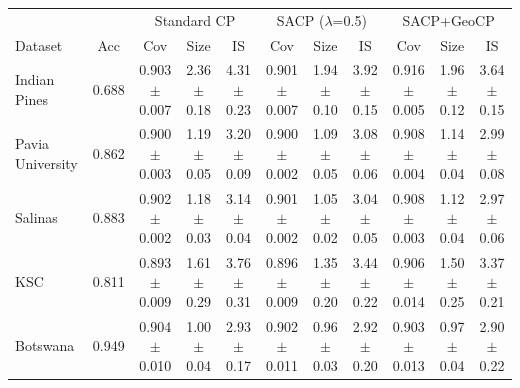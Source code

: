 \begin{tabular}{l|c|ccc|ccc|ccc}
\toprule
 & & \multicolumn{3}{c|}{Standard CP} & \multicolumn{3}{c|}{SACP ($\lambda$=0.5)} & \multicolumn{3}{c}{SACP+GeoCP} \\
Dataset & Acc & Cov & Size & IS & Cov & Size & IS & Cov & Size & IS \\
\midrule
Indian Pines & 0.688 & 0.903$\pm$0.007 & 2.36$\pm$0.18 & 4.31$\pm$0.23 & 0.901$\pm$0.007 & 1.94$\pm$0.10 & 3.92$\pm$0.15 & 0.916$\pm$0.005 & 1.96$\pm$0.12 & 3.64$\pm$0.15 \\
Pavia University & 0.862 & 0.900$\pm$0.003 & 1.19$\pm$0.05 & 3.20$\pm$0.09 & 0.900$\pm$0.002 & 1.09$\pm$0.05 & 3.08$\pm$0.06 & 0.908$\pm$0.004 & 1.14$\pm$0.04 & 2.99$\pm$0.08 \\
Salinas & 0.883 & 0.902$\pm$0.002 & 1.18$\pm$0.03 & 3.14$\pm$0.04 & 0.901$\pm$0.002 & 1.05$\pm$0.02 & 3.04$\pm$0.05 & 0.908$\pm$0.003 & 1.12$\pm$0.04 & 2.97$\pm$0.06 \\
KSC & 0.811 & 0.893$\pm$0.009 & 1.61$\pm$0.29 & 3.76$\pm$0.31 & 0.896$\pm$0.009 & 1.35$\pm$0.20 & 3.44$\pm$0.22 & 0.906$\pm$0.014 & 1.50$\pm$0.25 & 3.37$\pm$0.21 \\
Botswana & 0.949 & 0.904$\pm$0.010 & 1.00$\pm$0.04 & 2.93$\pm$0.17 & 0.902$\pm$0.011 & 0.96$\pm$0.03 & 2.92$\pm$0.20 & 0.903$\pm$0.013 & 0.97$\pm$0.04 & 2.90$\pm$0.22 \\
\bottomrule
\end{tabular}